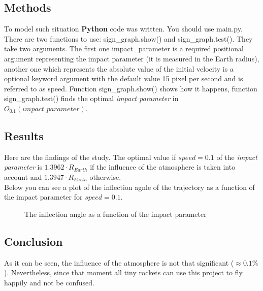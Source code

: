 \documentclass[a4paper,12pt]{article}
\begin{document}
\subsection*{Methods}
To model such situation \textbf{Python} code was written. You should use
\colorbox{gray!30}{main.py}. There are two functions to use:
\colorbox{gray!30}{sign\_graph.show()} and 
\colorbox{gray!30}{sign\_graph.test()}. They take two arguments.
The first one \colorbox{gray!30}{impact\_parameter} is a required positional
argument representing the impact parameter (it is measured in the 
Earth radius), another one which represents the absolute value of the
initial velocity is a optional keyword argument with the default value 15 pixel 
per second and is referred to as \colorbox{gray!30}{speed}. 
Function \colorbox{gray!30}{sign\_graph.show()} shows how it happens, 
function \colorbox{gray!30}{sign\_graph.test()} finds the optimal 
\textit{impact parameter} in \textit{$O_{0.1}(impact\_parameter)$}.
\subsection*{Results}
Here are the findings of the study. The optimal value if $\textit{speed} = 0.1$ of the \textit{impact parameter} 
is $1.3962 \cdot R_{Earth}$ if the influence of the atmosphere is taken into account 
and $1.3947 \cdot R_{Earth}$ otherwise.\\
Below you can see a plot of the inflection agnle of the trajectory as a function
of the impact parameter for $\textit{speed} = 0.1$.
\begin{figure}[h!]
	\caption{The inflection angle as a function of the impact parameter}
	\label{ris:plot}
\end{figure}
\subsection*{Conclusion}
As it can be seen, the influence of the atmosphere is not that significant 
($\approx 0.1\%$). Nevertheless, since that moment all tiny rockets can 
use this project to fly happily and not be confused.
\end{document}
